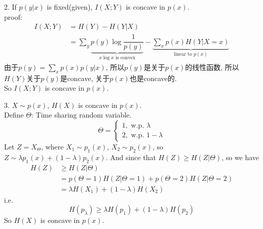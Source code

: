 2. If $p(y|x)$ is fixed(given), $I(X;Y)$ is concave in $p(x)$.\\
proof:
\begin{align*}
I(X;Y) &= H(Y) - H(Y|X) \\
&= \sum_{y}\underbrace{p(y)\log\dfrac{1}{p(y)}}_{x\log x \text{\ is convex}} - \underbrace{\sum_{x}p(x)H(Y|X=x)}_{\text{linear to } p(x)}
\end{align*}
由于$p(y)=\sum\limits_{x}p(x)p(y|x)$, 所以$p(y)$是关于$p(x)$的线性函数, 所以$H(Y)$关于$p(y)$是concave, 关于$p(x)$也是concave的. \\
So $I(X;Y)$ is concave in $p(x)$.

3. $X\sim p(x)$, $H(X)$ is concave in $p(x)$. \\
Define $\Theta$: Time sharing random variable. \\
$$\Theta=\left\{\begin{array}{l}1, \text{\ \ \ w.p.\ \ } \lambda \\2, \text{\ \ \ w.p.\ \ } 1-\lambda\end{array}\right.$$
Let $Z=X_{\Theta}$, where $X_1\sim p_1(x)$, $X_2\sim p_2(x)$, so $Z\sim \lambda p_1(x)+(1-\lambda)p_2(x)$.
And since that $H(Z)\geq H(Z|\Theta)$, so we have
\begin{align*}
H(Z) &\geq H(Z|\Theta) \\
&= p(\Theta=1)H(Z|\Theta=1)+p(\Theta=2)H(Z|\Theta=2) \\
&= \lambda H(X_1) + (1-\lambda)H(X_2)
\end{align*}
i.e. $$H(p_{\lambda})\geq \lambda H(p_1) + (1-\lambda)H(p_2)$$
So $H(X)$ is concave in $p(x)$.

